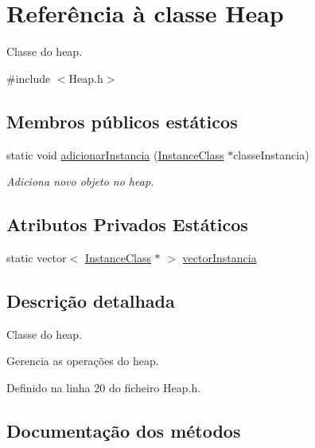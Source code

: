 \hypertarget{classHeap}{}\section{Referência à classe Heap}
\label{classHeap}


Classe do heap.  




{\ttfamily \#include $<$Heap.\+h$>$}

\subsection*{Membros públicos estáticos}
\begin{DoxyCompactItemize}
\item 
static void \hyperlink{classHeap_a5bae14e30e89b613358edb7171b50abb}{adicionar\+Instancia} (\hyperlink{classInstanceClass}{Instance\+Class} $\ast$classe\+Instancia)
\begin{DoxyCompactList}\small\item\em Adiciona novo objeto no heap. \end{DoxyCompactList}\end{DoxyCompactItemize}
\subsection*{Atributos Privados Estáticos}
\begin{DoxyCompactItemize}
\item 
static vector$<$ \hyperlink{classInstanceClass}{Instance\+Class} $\ast$ $>$ \hyperlink{classHeap_a4d3e406962272918e1a6144827c13c0c}{vector\+Instancia}
\end{DoxyCompactItemize}


\subsection{Descrição detalhada}
Classe do heap. 

Gerencia as operações do heap. 

Definido na linha 20 do ficheiro Heap.\+h.



\subsection{Documentação dos métodos}
\mbox{\label{classHeap_a5bae14e30e89b613358edb7171b50abb}} 
